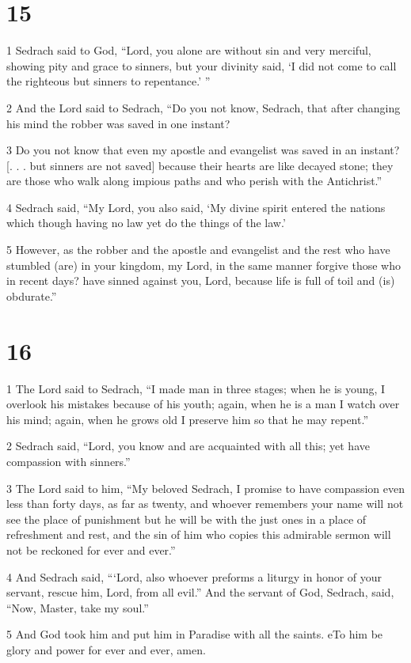\chapter{15}

\par 1 Sedrach said to God, “Lord, you alone are without sin and very merciful, showing pity and grace to sinners, but your divinity said, ‘I did not come to call the righteous but sinners to repentance.’ ” 

\par 2 And the Lord said to Sedrach, “Do you not know, Sedrach, that after changing his mind the robber was saved in one instant? 

\par 3 Do you not know that even my apostle and evangelist was saved in an instant? [. . . but sinners are not saved] because their hearts are like decayed stone; they are those who walk along impious paths and who perish with the Antichrist.” 

\par 4 Sedrach said, “My Lord, you also said, ‘My divine spirit entered the nations which though having no law yet do the things of the law.’ 

\par 5 However, as the robber and the apostle and evangelist and the rest who have stumbled (are) in your kingdom, my Lord, in the same manner forgive those who in recent days? have sinned against you, Lord, because life is full of toil and (is) obdurate.” 

\chapter{16}

\par 1 The Lord said to Sedrach, “I made man in three stages; when he is young, I overlook his mistakes because of his youth; again, when he is a man I watch over his mind; again, when he grows old I preserve him so that he may repent.” 

\par 2 Sedrach said, “Lord, you know and are acquainted with all this; yet have compassion with sinners.” 

\par 3 The Lord said to him, “My beloved Sedrach, I promise to have compassion even less than forty days, as far as twenty, and whoever remembers your name will not see the place of punishment but he will be with the just ones in a place of refreshment and rest, and the sin of him who copies this admirable sermon will not be reckoned for ever and ever.” 

\par 4 And Sedrach said, “‘Lord, also whoever preforms a liturgy in honor of your servant, rescue him, Lord, from all evil.” And the servant of God, Sedrach, said, “Now, Master, take my soul.” 

\par 5 And God took him and put him in Paradise with all the saints. eTo him be glory and power for ever and ever, amen. 




